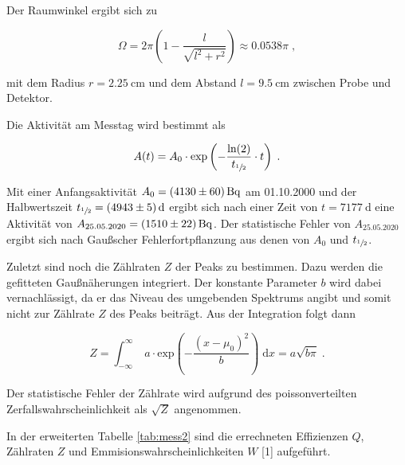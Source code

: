 Der Raumwinkel ergibt sich zu 

\begin{equation}
  \Omega = 2 \pi \left(1 - \frac{l}{\sqrt{l^2 + r^2}}\right) \approx \num{0.0538} \pi \; ,
\end{equation} 

mit dem Radius $r = \SI{2.25}{\centi\meter}$ und dem Abstand $l = \SI{9.5}{\centi\meter}$ zwischen Probe und Detektor.

Die Aktivität am Messtag wird bestimmt als

\begin{equation}
  A(t) = A_0 \cdot \text{exp} \left(- \frac{\text{ln}(2)}{t_{\sfrac{1}{2}}} \cdot t \right)  \; .
\end{equation}

Mit einer Anfangsaktivität $A_0 = \SI{4130 +- 60}{\becquerel}$ am 01.10.2000 und der Halbwertszeit
$t_{\sfrac{1}{2}} = \SI{4943 +- 5}{\day}$ ergibt sich nach einer Zeit von $t = \SI{7177}{\day}$
eine Aktivität von $A_{25.05.2020} = \SI{1510 +- 22}{\becquerel}$.
Der statistische Fehler von $A_{25.05.2020}$ ergibt sich nach 
Gaußscher Fehlerfortpflanzung aus denen von $A_0$ und $t_{\sfrac{1}{2}}$.

Zuletzt sind noch die Zählraten $Z$ der Peaks zu bestimmen. Dazu werden die gefitteten Gaußnäherungen integriert. 
Der konstante Parameter $b$ wird dabei vernachlässigt, da er das Niveau des umgebenden Spektrums angibt und somit nicht zur 
Zählrate $Z$ des Peaks beiträgt. Aus der Integration folgt dann

\begin{equation}
  Z = \int_{-\infty}^\infty \; a \cdot \text{exp}\left( - \frac{(x-\mu_0)^2}{b}\right) \; \text{d}x = a \sqrt{b\pi} \; .
  \label{eqn:rate}
\end{equation}

Der statistische Fehler der Zählrate wird aufgrund des poissonverteilten Zerfallswahrscheinlichkeit als $\sqrt{Z}$ angenommen.

In der erweiterten Tabelle \ref{tab:mess2} sind die errechneten Effizienzen $Q$, Zählraten $Z$ und 
Emmisionswahrscheinlichkeiten $W$ [1] aufgeführt.

